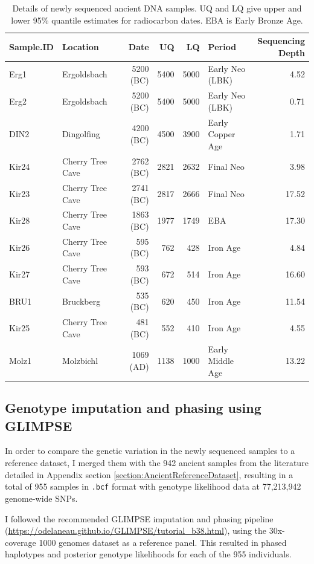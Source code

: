 \begin{table}
\centering
\begin{tabular}[t]{llrrrlr}
\toprule
Sample.ID & Location & Date  & UQ  & LQ  & Period & \thead{Sequencing\\ Depth}\\
\midrule
Erg1 & Ergoldsbach & 5200 (BC) & 5400 & 5000 & Early Neo (LBK) & 4.52\\
Erg2 & Ergoldsbach & 5200 (BC) & 5400 & 5000 & Early Neo (LBK) & 0.71\\
DIN2 & Dingolfing & 4200 (BC) & 4500 & 3900 & Early Copper Age & 1.71\\
Kir24 & Cherry Tree Cave & 2762 (BC) & 2821 & 2632 & Final Neo & 3.98\\
Kir23 & Cherry Tree Cave & 2741 (BC) & 2817 & 2666 & Final Neo & 17.52\\
Kir28 & Cherry Tree Cave & 1863 (BC) & 1977 & 1749 & EBA & 17.30\\
Kir26 & Cherry Tree Cave & 595 (BC) & 762 & 428 & Iron Age & 4.84\\
Kir27 & Cherry Tree Cave & 593 (BC) & 672 & 514 & Iron Age & 16.60\\
BRU1 & Bruckberg & 535 (BC) & 620 & 450 & Iron Age & 11.54\\
Kir25 & Cherry Tree Cave & 481 (BC) & 552 & 410 & Iron Age & 4.55\\
Molz1 & Molzbichl & 1069 (AD) & 1138 & 1000 & Early Middle Age & 13.22\\
\bottomrule
\end{tabular}
\caption{Details of newly sequenced ancient DNA samples. UQ and LQ give upper and lower 95\% quantile estimates for radiocarbon dates. EBA is Early Bronze Age.}
\label{tab:BavariaSampleInfo}
\end{table}

\subsection{Genotype imputation and phasing using GLIMPSE}
\label{sssec:imputationphasingGLIMPSE}

In order to compare the genetic variation in the newly sequenced samples to a reference dataset, I merged them with the 942 ancient samples from the literature detailed in Appendix section \ref{section:AncientReferenceDataset}, resulting in a total of 955 samples in \texttt{.bcf} format with genotype likelihood data at 77,213,942 genome-wide SNPs. 

I followed the recommended GLIMPSE \cite{rubinacci2021efficient} imputation and phasing pipeline (\url{https://odelaneau.github.io/GLIMPSE/tutorial_b38.html}), using the 30x-coverage 1000 genomes dataset \cite{byrska2021high} as a reference panel. This resulted in phased haplotypes and posterior genotype likelihoods for each of the 955 individuals. 

